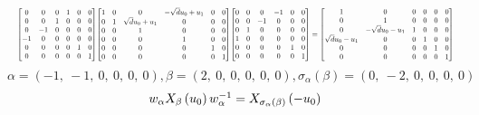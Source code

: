 \documentclass[11pt]{article}
\theoremstyle{definition}
\begin{document}
\[
\scaletoalign{\textwidth}{{\left[\begin{matrix}0 & 0 & 0 & 1 & 0 & 0\\0 & 0 & 1 & 0 & 0 & 0\\0 & -1 & 0 & 0 & 0 & 0\\-1 & 0 & 0 & 0 & 0 & 0\\0 & 0 & 0 & 0 & 1 & 0\\0 & 0 & 0 & 0 & 0 & 1\end{matrix}\right]} {\left[\begin{matrix}1 & 0 & 0 & - \sqrt{d} u_{0} + u_{1} & 0 & 0\\0 & 1 & \sqrt{d} u_{0} + u_{1} & 0 & 0 & 0\\0 & 0 & 1 & 0 & 0 & 0\\0 & 0 & 0 & 1 & 0 & 0\\0 & 0 & 0 & 0 & 1 & 0\\0 & 0 & 0 & 0 & 0 & 1\end{matrix}\right]} {\left[\begin{matrix}0 & 0 & 0 & -1 & 0 & 0\\0 & 0 & -1 & 0 & 0 & 0\\0 & 1 & 0 & 0 & 0 & 0\\1 & 0 & 0 & 0 & 0 & 0\\0 & 0 & 0 & 0 & 1 & 0\\0 & 0 & 0 & 0 & 0 & 1\end{matrix}\right]} = {\left[\begin{matrix}1 & 0 & 0 & 0 & 0 & 0\\0 & 1 & 0 & 0 & 0 & 0\\0 & - \sqrt{d} u_{0} - u_{1} & 1 & 0 & 0 & 0\\\sqrt{d} u_{0} - u_{1} & 0 & 0 & 1 & 0 & 0\\0 & 0 & 0 & 0 & 1 & 0\\0 & 0 & 0 & 0 & 0 & 1\end{matrix}\right]}}
\]
\[
\alpha = \left( -1, \  -1, \  0, \  0, \  0, \  0\right), \beta = \left( 2, \  0, \  0, \  0, \  0, \  0\right), \sigma_{\alpha}(\beta) = \left( 0, \  -2, \  0, \  0, \  0, \  0\right)
\]
\[
\scaletoalign{\textwidth}{w_{\alpha} X_{\beta}\left(u_{0}\right) w_{\alpha}^{-1} = X_{\sigma_{\alpha}\left(\beta\right)}\left(- u_{0}\right)}
\]
\end{document}
